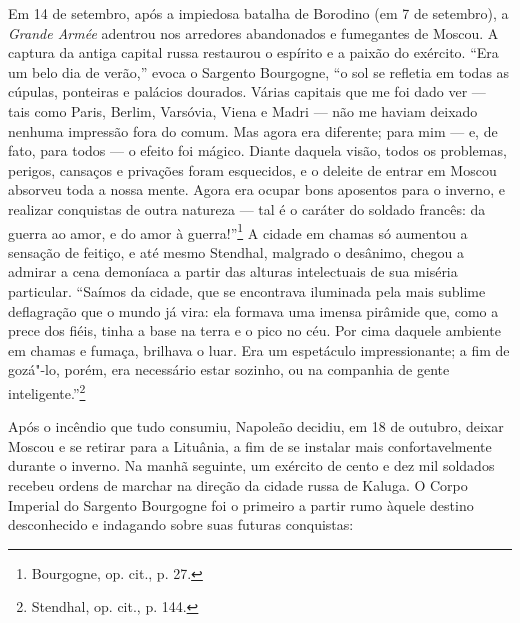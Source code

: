 \asterisc

Em 14 de setembro, após a impiedosa batalha de Borodino (em 7 de
setembro), a \textit{Grande Armée} adentrou nos arredores abandonados e
fumegantes de Moscou. A captura da antiga capital russa restaurou o
espírito e a paixão do exército. ``Era um belo dia de verão,'' evoca o
Sargento Bourgogne, ``o sol se refletia em todas as cúpulas, ponteiras e
palácios dourados. Várias capitais que me foi dado ver --- tais como
Paris, Berlim, Varsóvia, Viena e Madri --- não me haviam deixado nenhuma
impressão fora do comum. Mas agora era diferente; para mim --- e, de fato,
para todos --- o efeito foi mágico. Diante daquela visão, todos os
problemas, perigos, cansaços e privações foram esquecidos, e o deleite
de entrar em Moscou absorveu toda a nossa mente. Agora era ocupar bons
aposentos para o inverno, e realizar conquistas de outra natureza --- tal
é o caráter do soldado francês: da guerra ao amor, e do amor à
guerra!''\footnote{Bourgogne, op. cit., p. 27.} A cidade em chamas só
aumentou a sensação de feitiço, e até mesmo Stendhal, malgrado o
desânimo, chegou a admirar a cena demoníaca a partir das alturas
intelectuais de sua miséria particular. ``Saímos da cidade, que se
encontrava iluminada pela mais sublime deflagração que o mundo já vira:
ela formava uma imensa pirâmide que, como a prece dos fiéis, tinha a
base na terra e o pico no céu. Por cima daquele ambiente em chamas e
fumaça, brilhava o luar. Era um espetáculo impressionante; a fim de
gozá"-lo, porém, era necessário estar sozinho, ou na companhia de gente
inteligente.''\footnote{Stendhal, op. cit., p. 144.}

Após o incêndio que tudo consumiu, Napoleão decidiu, em 18 de outubro,
deixar Moscou e se retirar para a Lituânia, a fim de se instalar mais
confortavelmente durante o inverno. Na manhã seguinte, um exército de
cento e dez mil soldados recebeu ordens de marchar na direção da cidade
russa de Kaluga. O Corpo Imperial do Sargento Bourgogne foi o primeiro a
partir rumo àquele destino desconhecido e indagando sobre suas futuras
conquistas:

